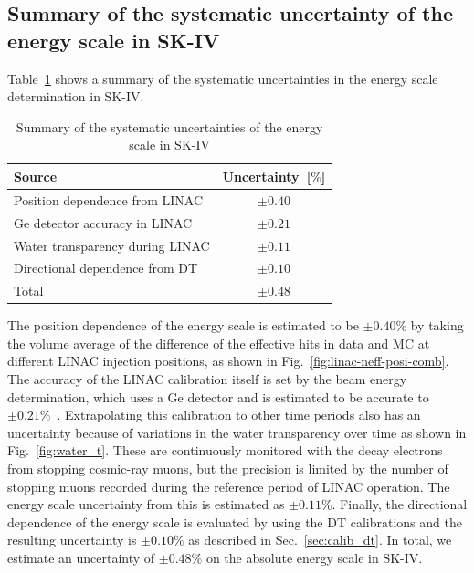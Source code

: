 \documentclass[aps,prd,reprint,superscriptaddress,floatfix,altaffilletter,nofootinbib]{revtex4-2}
\begin{document}
\subsection{Summary of the systematic uncertainty of the energy scale in SK-IV}\label{sec_summary_energy_scale}

Table~\ref{tbl:linac_sys} shows a summary of the systematic uncertainties in the energy scale determination in SK-IV.
\begin{table}[htp]
    \begin{center}
\caption{Summary of the systematic uncertainties of the energy scale in SK-IV}
        \label{tbl:linac_sys}
        \begin{tabular}{lc}
            \hline
            \hline
            Source & Uncertainty~[$\%$]\\ \hline
            Position dependence from LINAC  & $\pm0.40$ \\
            Ge detector accuracy in LINAC   & $\pm0.21$ \\
            Water transparency during LINAC & $\pm0.11$ \\
            Directional dependence from DT  & $\pm0.10$ \\
            \hline 
            Total & $\pm0.48$ \\
\hline
            \hline
        \end{tabular}
    \end{center}
\end{table}
The position dependence of the energy scale is estimated to be $\pm0.40\%$ by taking the volume average of the difference of the effective hits in data and MC at different LINAC injection positions, as shown in Fig.~\ref{fig:linac-neff-posi-comb}. The accuracy of the LINAC calibration itself is set by the beam energy determination, which uses a  Ge detector and is estimated to be accurate to $\pm0.21\%$~\cite{Nakahata:1998pz}. Extrapolating this calibration to other time periods also has an uncertainty because of variations in the water transparency over time as shown in Fig.~\ref{fig:water_t}. These are continuously monitored with the decay electrons from stopping cosmic-ray muons, but the precision is limited by the number of stopping muons recorded during the reference period of LINAC operation. The energy scale uncertainty from this is estimated as $\pm 0.11\%$.  Finally, the directional dependence of the energy scale is evaluated by using the DT calibrations and the resulting uncertainty is 
$\pm0.10\%$ 
as described in Sec.~\ref{sec:calib_dt}. In total, we estimate an uncertainty of 
$\pm0.48\%$ on the absolute energy scale in SK-IV.
\end{document}
